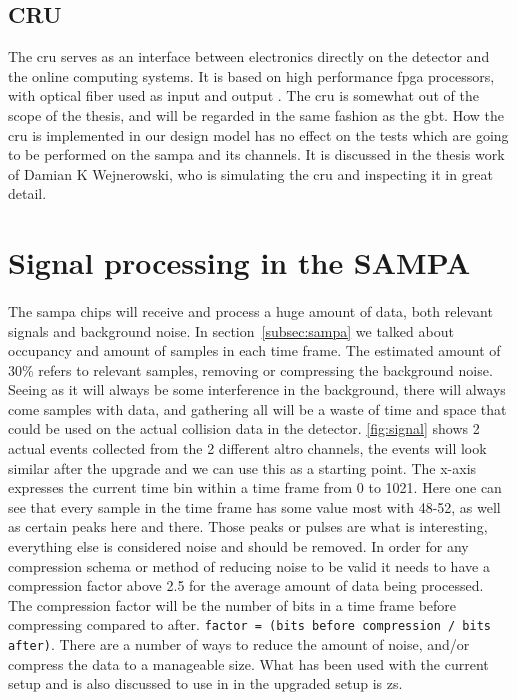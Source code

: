 \documentclass[a4paper, 12pt]{report}
\newcommand{\codeword}[1]{\texttt{#1}}
\begin{document}
\subsection{CRU}
The \gls{cru} serves as an interface between electronics directly on the detector and the online computing systems.
It is based on high performance \gls{fpga} processors, with optical fiber used as input and output \cite{tdr-015}. 
The \gls{cru} is somewhat out of the scope of the thesis, and will be regarded in the same fashion as the \gls{gbt}.
How the \gls{cru} is implemented in our design model has no effect on the tests which are going to be performed on the \gls{sampa} and its channels.
It is discussed in the thesis work of Damian K Wejnerowski, who is simulating the \gls{cru} and inspecting it in great detail.

\section{Signal processing in the SAMPA}
\paragraph{}
The \gls{sampa} chips will receive and process a huge amount of data, both relevant signals and background noise.
In section~\ref{subsec:sampa} we talked about occupancy and amount of samples in each time frame.
The estimated amount of 30\% refers to relevant samples, removing or compressing the background noise.
Seeing as it will always be some interference in the background, there will always come samples with data, and gathering all will be a waste of time and space that could be used on the actual collision data in the detector.
\ref{fig:signal} shows 2 actual events collected from the 2 different \gls{altro} channels, the events will look similar after the upgrade and we can use this as a starting point.
The x-axis expresses the current time bin within a time frame from 0 to 1021.
Here one can see that every sample in the time frame has some value most with 48-52, as well as certain peaks here and there.
Those peaks or pulses are what is interesting, everything else is considered noise and should be removed.
In order for any compression schema or method of reducing noise to be valid it needs to have a compression factor above 2.5 for the average amount of data being processed.
The compression factor will be the number of bits in a time frame before compressing compared to after. \codeword{factor = (bits before compression / bits after)}.
There are a number of ways to reduce the amount of noise, and/or compress the data to a manageable size.
What has been used with the current setup and is also discussed to use in in the upgraded setup is \gls{zs}.
\end{document}
